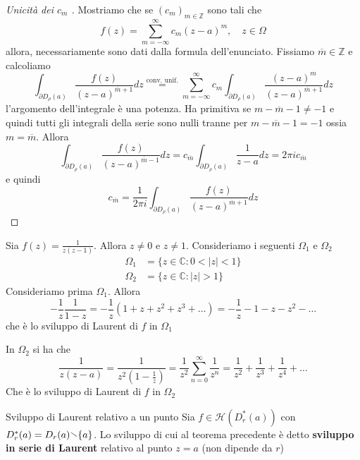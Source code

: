 \begin{proof}[Unicità dei \(c_{m}\) ]
    Mostriamo che se \({(c_{m})}_{m \in \mathbb{Z}}  \) sono tali che 
\[
    f{(z)} = \sum_{m=-\infty}^{\infty} c_{m} {(z-a)}^{m}, \quad z \in \Omega 
\]
    allora, necessariamente sono dati dalla formula dell'enunciato. Fissiamo
    \(\overline{m} \in \mathbb{Z}\) e calcoliamo
\[
    \int_{\partial D_{\rho} {(a)}} \frac{f{(z)}}{{(z-a)}^{\overline{m}+1}} dz
\overset{\text{conv. unif.}}{=} \sum_{m=-\infty}^{\infty} c_{m} \int_{\partial
D_{\rho} {(a)}} \frac{{(z-a)}^{m}}{{(z-a)}^{\overline{m}+1}} dz 
\]
    l'argomento dell'integrale è una potenza. Ha primitiva se \(m -\overline{m}
    - 1 \neq -1\) e quindi tutti gli integrali della serie sono nulli tranne per
    \(m - \overline{m} - 1 = -1\) ossia \(m = \overline{m}\). Allora
\[
    \int_{\partial D_{\rho} {(a)}} \frac{f{(z)}}{{(z-a)}^{\overline{m}-1}}dz =
    c_{\overline{m}} \int_{\partial D_{\rho} {(a)}} \frac{1}{z-a} dz = 2\pi i
    c_{\overline{m}} 
\]
    e quindi
\[
    c_{\overline{m}} = \frac{1}{2\pi i} \int_{\partial D_{\rho} {(a)}}
    \frac{f{(z)}}{{(z-a)}^{\overline{m}+1}} dz
\]
\end{proof}

\begin{example}
    Sia \(\displaystyle f{(z)} = \frac{1}{z{(z-1)}}\). Allora \(z\neq 0\) e
    \(z\neq 1\). Consideriamo i seguenti \(\Omega_{1}\) e \(\Omega_{2}\) 
    \begin{align*}
        \Omega_{1} &= \{z \in \mathbb{C} : 0 < |z| < 1\}  \\
        \Omega_{2} &= \{z \in \mathbb{C} : |z| > 1\}
    \end{align*}
    Consideriamo prima \(\Omega_{1}\). Allora
\[
    -\frac{1}{z} \frac{1}{1-z} = -\frac{1}{z} {(1 + z + z^2 + z^3 + \dots)} =
    -\frac{1}{z} - 1 - z - z^2 - \dots
\]
che è lo sviluppo di Laurent di \(f\) in \(\Omega_{1}\)

    In \(\Omega_{2}\) si ha che
\[
    \frac{1}{z{(z-a)}} = \frac{1}{z^2 {\left(1 - \frac{1}{z}\right)}} =
    \frac{1}{z^2} \sum_{n=0}^{\infty} \frac{1}{z^{n}} = \frac{1}{z^2} +
    \frac{1}{z^3} + \frac{1}{z^{4}} + \dots
\]
    Che è lo sviluppo di Laurent di \(f\)  in \(\Omega_{2}\) 
\end{example}

\begin{definition}{Sviluppo di Laurent relativo a un punto}
    Sia \(f \in \mathcal{H}{(D_{r}^{*} {(a)})}\) con \(D_{r}^{*} {(a)} =
    D_r{(a)} \sminus \{a\} \). Lo sviluppo di cui al teorema precedente è detto
    \textbf{sviluppo in serie di Laurent} relativo al punto \(z=a\) (non dipende
    da \(r\))
\end{definition}

